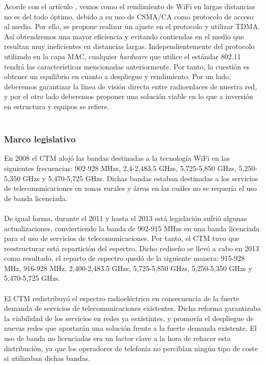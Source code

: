 Acorde con el artículo \cite{simo2014assessing}, vemos como el rendimiento de WiFi en largas distancias no es del todo óptimo, debido a su uso de CSMA/CA como protocolo de acceso al medio. Por ello, se propone realizar un ajuste en el protocolo y utilizar TDMA. Así obtendremos una mayor eficiencia y evitando contiendas en el medio que resultan muy ineficientes en distancias largas. Independientemente del protocolo utilizado en la capa MAC, cualquier \textit{hardware} que utilice el estándar 802.11 tendrá las características mencionadas anteriormente. Por tanto, la cuestión es obtener un equilibrio en cuanto a despliegue y rendimiento. Por un lado, deberemos garantizar la línea de visión directa entre radioenlaces de nuestra red, y por el otro lado deberemos proponer una solución viable en lo que a inversión en estructura y equipos se refiere.\\\\

\subsubsection{Marco legislativo}
En 2008 el CTM alojó las bandas destinadas a la tecnología WiFi en las siguientes frecuencias: 902-928 MHzs, 2,4-2,483.5 GHzs, 5,725-5,850 GHzs, 5,250-5,350 GHzs y 5,470-5,725 GHzs. Dichas bandas estaban destinadas a los servicios de telecomunicaciones en zonas rurales y áreas en las cuáles no se requería el uso de banda licenciada. \\\\

De igual forma, durante el 2011 y hasta el 2013 está legislación sufrió algunas actualizaciones, conviertiendo la banda de 902-915 MHzs en una banda licenciada para el uso de servicios de telecomunicaciones. Por tanto, el CTM tuvo que reestructurar está repartición del espectro. Dicho rediseño se llevó a cabo en 2013 como resultado, el reparto de espectro quedó de la siguiente manera: 915-928 MHz, 916-928 MHz, 2,400-2,483.5 GHzs, 5,725-5,850 GHzs, 5,250-5,350 GHzs y 5,470-5,725 GHzs.\\\\

El CTM redistribuyó el espectro radioeléctrico en consecuencia de la fuerte demanda de servicios de telecomunicaciones existentes. Dicha reforma garantizaba la viabilidad de los servicios en redes ya esxistintes, y promovía el despliegue de nuevas redes que aportarán una solución frente a la fuerte demanda existente. El uso de banda no licenciadas era un factor clave a la hora de rehacer esta distribución, ya que los operadores de telefonía no percibían ningún tipo de coste si utilizaban dichas bandas.\\\\

